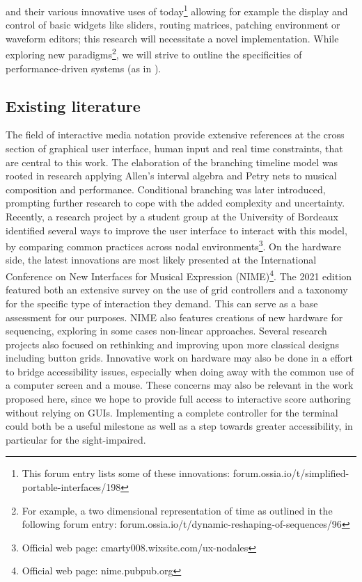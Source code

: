 \documentclass[journal,onecolumn]{IEEEtran}
\begin{document}
and their various innovative uses of today\footnote{This forum entry lists some of these innovations: forum.ossia.io/t/simplified-portable-interfaces/198} allowing for example the display and control of basic widgets like sliders, routing matrices, patching environment or waveform editors; this research will necessitate a novel implementation. While exploring new paradigms\footnote{For example, a two dimensional representation of time as outlined in the following forum entry: forum.ossia.io/t/dynamic-reshaping-of-sequences/96}, we will strive to outline the specificities of performance-driven systems (as in \cite{nash:liveness}).


\subsection{Existing literature}
The field of interactive media notation\cite{ircam:antescofo}\cite{buzzing:iannix}\cite{grame:inscore} provide extensive references at the cross section of graphical user interface, human input and real time constraints, that are central to this work. 
The elaboration of the branching timeline model was rooted in research applying Allen's interval algebra\cite{allombert:constraint} and Petry nets\cite{allombert:petri} to musical composition and performance. Conditional branching was later introduced\cite{toro:condition}, prompting further research to cope with the added complexity and uncertainty\cite{arias:colour}. Recently, a research project by a student group at the University of Bordeaux identified several ways to improve the user interface to interact with this model, by comparing common practices across nodal environments\footnote{Official web page: cmarty008.wixsite.com/ux-nodales}. On the hardware side, the latest innovations are most likely presented at the International Conference on New Interfaces for Musical Expression (NIME)\footnote{Official web page: nime.pubpub.org}. The 2021 edition featured both an extensive survey on the use of grid controllers\cite{rossmy:grid} and a taxonomy for the specific type of interaction they demand\cite{pust:taxonomy}. This can serve as a base assessment for our purposes. 
NIME also features creations of new hardware for sequencing\cite{arellano:radear}, exploring in some cases non-linear approaches\cite{hayes:neurohedron}. Several research projects also focused on rethinking and improving upon more classical designs\cite{snyder:jd} including button grids\cite{rossmy:touch}. Innovative work on hardware may also be done in a effort to bridge accessibility issues\cite{forester:loopblocks}, especially when doing away with the common use of a computer screen and a mouse. These concerns may also be relevant in the work proposed here, since we hope to provide full access to interactive score authoring without relying on GUIs. Implementing a complete controller for the terminal could both be a useful milestone as well as a step towards greater accessibility, in particular for the sight-impaired. 
\end{document}
